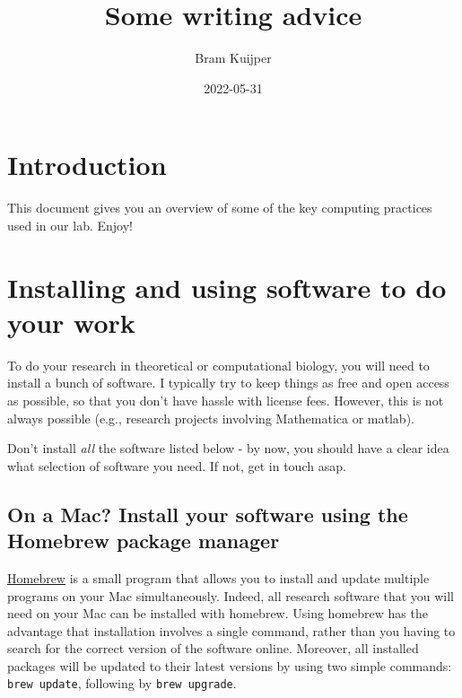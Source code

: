 \documentclass[
]{book}
\title{Some writing advice}
\author{Bram Kuijper}
\date{2022-05-31}
\begin{document}
\maketitle

{
\setcounter{tocdepth}{1}
\tableofcontents
}
\hypertarget{introduction}{%
\chapter{Introduction}\label{introduction}}

This document gives you an overview of some of the key computing practices used in our lab. Enjoy!

\hypertarget{installing-and-using-software-to-do-your-work}{%
\chapter{Installing and using software to do your work}\label{installing-and-using-software-to-do-your-work}}

To do your research in theoretical or computational biology, you will need to install a bunch of software. I typically try to keep things as free and open access as possible, so that you don't have hassle with license fees. However, this is not always possible (e.g., research projects involving Mathematica or matlab).

Don't install \emph{all} the software listed below - by now, you should have a clear idea what selection of software you need. If not, get in touch asap.

\hypertarget{on-a-mac-install-your-software-using-the-homebrew-package-manager}{%
\section{On a Mac? Install your software using the Homebrew package manager}\label{on-a-mac-install-your-software-using-the-homebrew-package-manager}}

\href{https://brew.sh}{Homebrew} is a small program that allows you to install and update multiple programs on your Mac simultaneously. Indeed, all research software that you will need on your Mac can be installed with homebrew. Using homebrew has the advantage that installation involves a single command, rather than you having to search for the correct version of the software online. Moreover, all installed packages will be updated to their latest versions by using two simple commands: \texttt{brew\ update}, following by \texttt{brew\ upgrade}.
\end{document}
